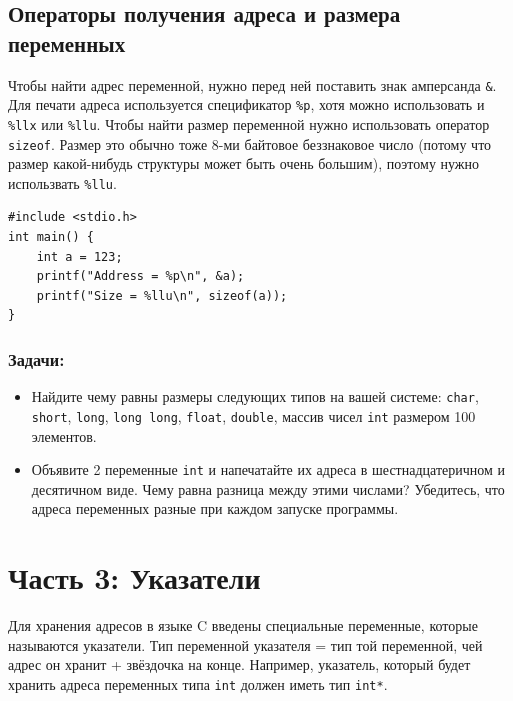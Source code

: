 \documentclass{article}
\begin{document}
\subsection*{Операторы получения адреса и размера переменных}
Чтобы найти адрес переменной, нужно перед ней поставить знак амперсанда \texttt{\&}. Для печати адреса используется спецификатор \texttt{\%p}, хотя можно использовать и \texttt{\%llx} или \texttt{\%llu}. Чтобы найти размер переменной нужно использовать оператор \texttt{sizeof}. Размер это обычно тоже 8-ми байтовое беззнаковое число (потому что размер какой-нибудь структуры может быть очень большим), поэтому нужно использвать \texttt{\%llu}.\\
\begin{lstlisting}
#include <stdio.h>
int main() {
    int a = 123;
    printf("Address = %p\n", &a);
    printf("Size = %llu\n", sizeof(a));
}
\end{lstlisting}
\subsubsection*{Задачи:}
\begin{itemize}
\item Найдите чему равны размеры следующих типов на вашей системе: \texttt{char}, \texttt{short}, \texttt{long}, \texttt{long long}, \texttt{float}, \texttt{double}, массив чисел \texttt{int} размером 100 элементов.
\item Объявите 2 переменные \texttt{int} и напечатайте их адреса в шестнадцатеричном и десятичном виде. Чему равна разница между этими числами? Убедитесь, что адреса переменных разные при каждом запуске программы.
\end{itemize}

\newpage
\section*{Часть 3: Указатели}
Для хранения адресов в языке C введены специальные переменные, которые называются указатели. Тип переменной указателя = тип той переменной, чей адрес он хранит + звёздочка на конце. Например, указатель, который будет хранить адреса переменных типа \texttt{int} должен иметь тип \texttt{int*}. \\
\end{document}
